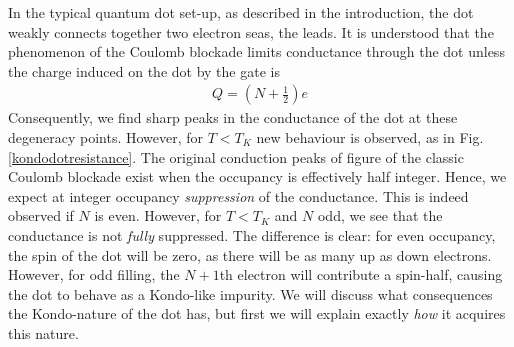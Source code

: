 \documentclass[twocolumn]{el-author}
\begin{document}
In the typical quantum dot set-up, as described in the introduction, the dot weakly connects together two electron seas, the leads.  It is understood that the phenomenon of the Coulomb blockade limits conductance through the dot unless the charge induced on the dot by the gate is
\begin{align}
  Q=\left(N+\frac{1}{2}\right)e
\end{align}
Consequently, we find sharp peaks in the conductance of the dot at these degeneracy points.  However, for $T<T_{K}$ new behaviour is observed, as in Fig. \ref{kondodotresistance}.  The original conduction peaks of figure of the classic Coulomb blockade exist when the occupancy is effectively half integer.  Hence, we expect at integer occupancy \emph{suppression} of the conductance.  This is indeed observed if $N$ is even.  However, for $T<T_{K}$ and $N$ odd, we see that the conductance is not \emph{fully} suppressed.  The difference is clear: for even occupancy, the spin of the dot will be zero, as there will be as many up as down electrons.  However, for odd filling, the $N+1$th electron will contribute a spin-half, causing the dot to behave as a Kondo-like impurity.  We will discuss what consequences the Kondo-nature of the dot has, but first we will explain exactly \emph{how} it acquires this nature.
\end{document}
